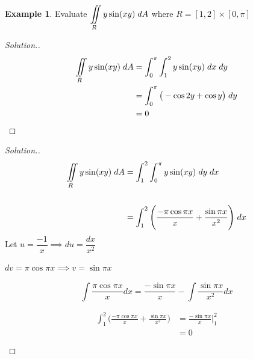 \documentclass[11pt,a4paper]{article}
\theoremstyle{definition}
\newtheorem{exa}[thm]{Example}
\newenvironment{solution}
  {\renewcommand{\qedsymbol}{}\begin{proof}[\textit{Solution}.]}
  {\end{proof}}
\begin{document}
\begin{exa}


Evaluate $\displaystyle{\iint\limits_R y \sin (xy)\hspace{0.1cm}dA}$ where $R = [1,2]\times [0,\pi]$
\end{exa}


\begin{solution}
\begin{align*}
\iint\limits_R y \sin (xy) \hspace{0.1cm} dA & = \int^{\pi}_0 \int^2_1 y\sin (xy) \hspace{0.1cm}dx\hspace{0.1cm} dy\\
& = \int^{\pi}_0 \big(-\cos 2y + \cos y\big)\hspace{0.1cm} dy\\
& = 0\\
\end{align*}
\end{solution}

\begin{solution}
\begin{align*}
\iint\limits_R y \sin (xy) \hspace{0.1cm} dA & = \int^2_1 \int^{\pi}_0 y\sin (xy) \hspace{0.1cm}dy\hspace{0.1cm} dx\\\\
& =\int^2_1 \Bigg( \frac{-\pi \cos \pi x}{x} + \frac{\sin \pi x}{x^2}\Bigg) \hspace{0.1cm}dx
\end{align*}
Let $u = \dfrac{-1}{x} \implies du = \dfrac{dx}{x^2}$


$dv = \pi \cos \pi x \implies v = \sin \pi x$


$$\int \frac{\pi \cos \pi x}{x}dx = \frac{- \sin \pi x}{x} - \int \frac{\sin \pi x}{x^2}dx$$

\begin{align*}
\int^2_1 \Bigg( \frac{-\pi \cos \pi x}{x} + \frac{\sin \pi x}{x^2}\Bigg) & = \frac{-\sin \pi x}{x}\Bigg|^2_1\\
& = 0\\\\
\end{align*}
\end{solution}
\end{document}
